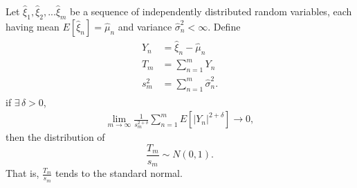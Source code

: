 \begin{singlespacing}
\begin{theorem}\label{clt}
Let $\hat{\xi}_1, \hat{\xi}_2, ...\hat{\xi}_m$ be a sequence of independently distributed random
variables, each having mean $E[\hat{\xi}_n]=\hat{\mu}_n$ and variance
$\hat{\sigma}_n^2 < \infty$. Define
\begin{align*}
\begin{split}
Y_n &=\hat{\xi}_n - \hat{\mu}_n\\
T_m &= \sum_{n=1}^{m}Y_n\\
s_m^2 &=\sum_{n=1}^m\hat{\sigma}_n^2.
\end{split}
\end{align*}
if $\exists\, \delta>0$,
\begin{align*}
\lim_{m\to \infty}\frac{1}{s_m^{2+\delta}}\sum_{n=1}^mE[|Y_n|^{2+\delta}] \to 0,
\end{align*}
then the distribution of
\begin{equation*}
\frac{T_m}{s_m} \sim N(0,1).
\end{equation*}
That is, $\frac{T_m}{s_m}$ tends to the standard normal.
\end{theorem}
\end{singlespacing}

